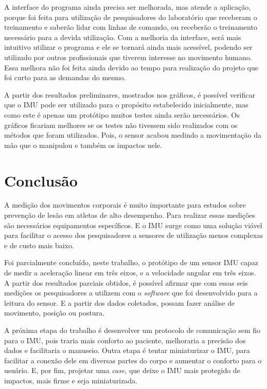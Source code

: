	A interface do programa ainda precisa ser melhorada, mas atende a aplicação, porque foi feita para utilização de pesquisadores do laboratório que receberam o treinamento e saberão lidar com linhas de comando, ou receberão o treinamento necessário para a devida utilização. Com a melhoria da interface, será mais intuitivo utilizar o programa e ele se tornará ainda mais acessível, podendo ser utilizado por outros profissionais que tiverem interesse no movimento humano. Essa melhora não foi feita ainda devido ao tempo para realização do projeto que foi curto para as demandas do mesmo.
	
	 A partir dos resultados preliminares, mostrados nos gráficos, é possível verificar que o IMU pode ser utilizado para o propósito estabelecido inicialmente, mas como este é apenas um protótipo muitos testes ainda serão necessários. Os gráficos ficariam melhores se os testes não tivessem sido realizados com os métodos que foram utilizados. Pois, o sensor acabou medindo a movimentação da mão que o manipulou e também os impactos nele.
	
\chapter{Conclusão}
	
	A medição dos movimentos corporais é muito importante para estudos sobre prevenção de lesão em atletas de alto desempenho. Para realizar essas medições são necessários equipamentos específicos. E o IMU surge como uma solução viável para facilitar o acesso dos pesquisadores a sensores de utilização menos complexas e de custo mais baixo. 
	
	Foi parcialmente concluído, neste trabalho, o protótipo de um sensor IMU capaz de medir a aceleração linear em três eixos, e a velocidade angular em três eixos. A partir dos resultados parciais obtidos, é possível afirmar que com essas seis medições os pesquisadores a utilizem com o \textit{software} que foi desenvolvido para a leitura do sensor.  E a partir dos dados coletados, possam fazer análise de movimento, posição ou postura.
	
	A próxima etapa do trabalho é desenvolver um protocolo de comunicação sem fio para o IMU, pois traria mais conforto ao paciente, melhoraria a precisão dos dados e facilitaria o manuseio. Outra etapa é tentar miniaturizar o IMU, para facilitar a conexão dele em diversas partes do corpo e aumentar o conforto para o usuário. E, por fim, projetar uma \textit{case}, que deixe o IMU mais protegido de impactos, mais firme e seja miniaturizada. 